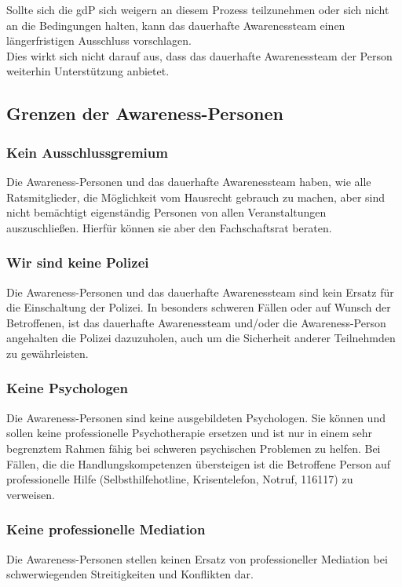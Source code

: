 \documentclass{article}
\begin{document}
Sollte sich die gdP sich weigern an diesem Prozess teilzunehmen oder sich nicht an die Bedingungen halten,
kann das dauerhafte Awarenessteam einen längerfristigen Ausschluss vorschlagen.\\
Dies wirkt sich nicht darauf aus, dass das dauerhafte Awarenessteam der Person weiterhin Unterstüt\-zung anbietet.

\subsection{Grenzen der Awareness-Personen}

\subsubsection{Kein Ausschlussgremium}
Die Awareness-Personen und das dauerhafte Awarenessteam haben, wie alle Ratsmitglieder, die Mög\-lich\-keit vom Hausrecht gebrauch zu machen, aber sind nicht bemächtigt 
eigenständig Personen von allen Veranstaltungen auszuschließen. Hierfür können sie aber den Fachschaftsrat beraten.

\subsubsection{Wir sind keine Polizei}
Die Awareness-Personen und das dauerhafte Awarenessteam sind kein Ersatz für die Einschaltung der Polizei. In besonders schweren Fällen oder auf Wunsch der Betroffenen, ist 
das dauerhafte Awarenessteam und/oder die Awareness-Person angehalten die Polizei dazuzuholen, auch um die Sicherheit anderer Teilnehmden zu gewährleisten.

\subsubsection{Keine Psychologen}
Die Awareness-Personen sind keine ausgebildeten Psychologen. Sie können und sollen keine professionelle Psychotherapie ersetzen und ist nur in einem sehr begrenztem Rahmen 
fähig bei schweren psychischen Problemen zu helfen. Bei Fällen, die die Handlungskompetenzen übersteigen ist die Betroffene Person auf professionelle Hilfe 
(Selbsthilfehotline, Krisentelefon, Notruf, 116117) zu verweisen. 

\subsubsection{Keine professionelle Mediation}
Die Awareness-Personen stellen keinen Ersatz von professioneller Mediation bei schwerwiegenden Streitigkeiten und Konflikten dar. 
\end{document}
